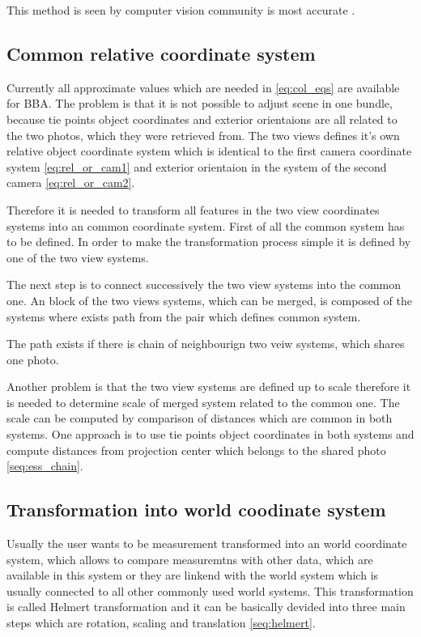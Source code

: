 \documentclass[a4paper,12pt]{report}
\begin{document}
This method is seen by computer vision community is most accurate \cite[p. 315]{Hartley2004}.  


\subsection{Common relative coordinate system}

Currently all approximate values which are needed in \eqref{eq:col_eqs} are available for BBA. 
The problem is that it is not possible to adjust scene in one bundle, because tie points
object coordinates and exterior orientaions are all related to the two photos, which they were 
retrieved from. The two views defines it's own relative object coordinate system which is identical
to the first camera coordinate system \eqref{eq:rel_or_cam1} and
exterior orientaion in the system of the second camera \eqref{eq:rel_or_cam2}.


Therefore it is needed to transform all features in the two view coordinates systems into 
an common coordinate system. First of all the common system has to be defined.
In order to make the transformation process simple it is defined by one of the two view
systems.

The next step is to connect successively the two view systems into the common one.  
An block of the two views systems, which can be merged, is composed of the systems 
where exists path from the pair which defines common system.

The path exists if there is chain of neighbourign two veiw systems, which 
shares one photo. 

Another problem is that the two view systems are defined up to scale therefore 
it is needed to determine scale of merged system related to the common one. 
The scale can be computed by comparison of distances which are common in both systems.
One approach is to use tie points object coordinates in both systems 
and compute distances from projection center which belongs to the shared photo \ref{seq:ess_chain}. 


\subsection{Transformation into world coodinate system}

Usually the user wants to be measurement transformed into an world coordinate system, which allows 
to compare measuremtns with other data, which are available in this system or they are 
linkend with the world system which is usually connected to all other commonly used  world systems. 
This transformation is called Helmert  transformation and it can be basically devided into 
three main steps which are rotation, scaling and translation \ref{seq:helmert}.
\end{document}
